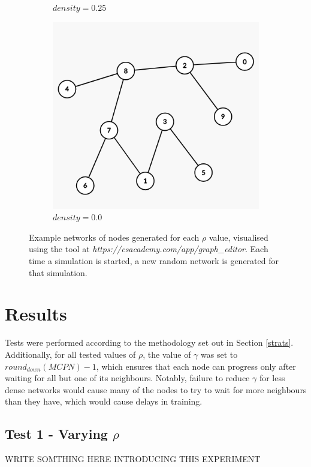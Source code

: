 \documentclass[letterpaper, 10 pt, conference]{ieeeconf}  %
\begin{document}
\begin{figure}[H]
\begin{subfigure}[b]{0.15\textwidth}
		\caption{$density=0.25$}
	\end{subfigure}
	\begin{subfigure}[b]{0.15\textwidth}
		\centering
		\includegraphics[width=\textwidth]{sparsegraph0}
		\caption{$density=0.0$}
	\end{subfigure}
	\caption{Example networks of nodes generated for each $\rho$ value, visualised using the tool at \emph{https://csacademy.com/app/graph\_editor}. Each time a simulation is started, a new random network is generated for that simulation. \label{densefig}}
{}\end{figure}

\section{Results}
Tests were performed according to the methodology set out in Section \ref{strats}. Additionally, for all tested values of $\rho$, the value of $\gamma$ was set to $round_{down}(MCPN) - 1$, which ensures that each node can progress only after waiting for all but one of its neighbours. Notably, failure to reduce $\gamma$ for less dense networks would cause many of the nodes to try to wait for more neighbours than they have, which would cause delays in training.

\subsection{Test 1 - Varying $\rho$}
WRITE SOMTHING HERE INTRODUCING THIS EXPERIMENT
\end{document}

